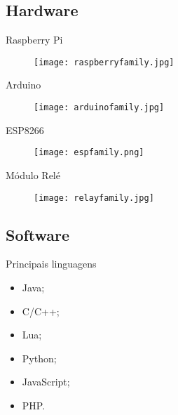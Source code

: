 \subsection*{Hardware}
\begin{frame}{Raspberry Pi}
	\begin{figure}[H]
		\texttt{[image: raspberryfamily.jpg]}\footnotemark
	\end{figure}
	
\end{frame}

\begin{frame}{Arduino}
	\begin{figure}[H]
		\texttt{[image: arduinofamily.jpg]}\footnotemark
	\end{figure}
	
\end{frame}

\begin{frame}{ESP8266}
	\begin{figure}[H]
		\texttt{[image: espfamily.png]}\footnotemark
	\end{figure}
	
\end{frame}

\begin{frame}{Módulo Relé}
	\begin{figure}[H]
		\texttt{[image: relayfamily.jpg]}\footnotemark
	\end{figure}
	
\end{frame}

\subsection*{Software}
\begin{frame}{}
	\begin{block}{Principais linguagens}
		\begin{itemize}
			\item Java;
			\item C/C++;
			\item Lua;
			\item Python;
			\item JavaScript;
			\item PHP.
		\end{itemize}
	\end{block}
\end{frame}

